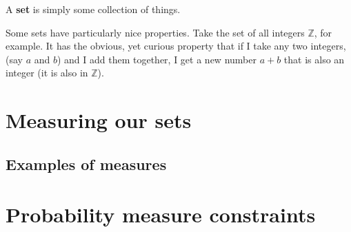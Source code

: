 \documentclass{article}
\begin{document}
A \textbf{set} is simply some collection of things. %

Some sets have particularly nice properties. Take the set of all integers $\mathbb{Z}$, for example. It has the obvious, yet curious property that if I take any two integers, (say $a$ and $b$) and I add them together, I get a new number $a + b$ that is also an integer (it is also in $\mathbb{Z}$). 





\section{Measuring our sets}





\subsection{Examples of measures}





\section{Probability measure constraints}

\end{document}
